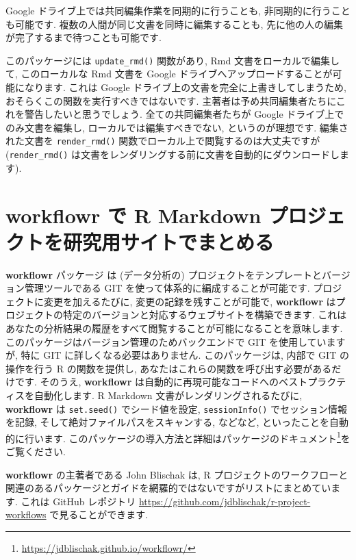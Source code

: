 \documentclass[
  11pt,
]{bxjsreport}
\renewcommand{\href}[2]{#2\footnote{\url{#1}}}
\begin{document}
Google ドライブ上では共同編集作業を同期的に行うことも, 非同期的に行うことも可能です. 複数の人間が同じ文書を同時に編集することも, 先に他の人の編集が完了するまで待つことも可能です.

このパッケージには \texttt{update\_rmd()} 関数があり, Rmd 文書をローカルで編集して, このローカルな Rmd 文書を Google ドライブへアップロードすることが可能になります. これは Google ドライブ上の文書を完全に上書きしてしまうため, おそらくこの関数を実行すべきではないです. 主著者は予め共同編集者たちにこれを警告したいと思うでしょう. 全ての共同編集者たちが Google ドライブ上でのみ文書を編集し, ローカルでは編集すべきでない, というのが理想です. 編集された文書を \texttt{render\_rmd()} 関数でローカル上で閲覧するのは大丈夫ですが (\texttt{render\_rmd()} は文書をレンダリングする前に文書を自動的にダウンロードします).

\hypertarget{workflowr}{%
\section{\texorpdfstring{\textbf{workflowr} で R Markdown プロジェクトを研究用サイトでまとめる}{workflowr で R Markdown プロジェクトを研究用サイトでまとめる}}\label{workflowr}}

\textbf{workflowr} パッケージ \autocite{R-workflowr,workflowr2019}は (データ分析の) プロジェクトをテンプレートとバージョン管理ツールである GIT を使って体系的に編成することが可能です. プロジェクトに変更を加えるたびに, 変更の記録を残すことが可能で, \textbf{workflowr} はプロジェクトの特定のバージョンと対応するウェブサイトを構築できます. これはあなたの分析結果の履歴をすべて閲覧することが可能になることを意味します. このパッケージはバージョン管理のためバックエンドで GIT を使用していますが, 特に GIT に詳しくなる必要はありません. このパッケージは, 内部で GIT の操作を行う R の関数を提供し, あなたはこれらの関数を呼び出す必要があるだけです. そのうえ, \textbf{workflowr} は自動的に再現可能なコードへのベストプラクティスを自動化します. R Markdown 文書がレンダリングされるたびに, \textbf{workflowr} は \texttt{set.seed()} でシード値を設定, \texttt{sessionInfo()} でセッション情報を記録, そして絶対ファイルパスをスキャンする, などなど, といったことを自動的に行います. このパッケージの導入方法と詳細は\href{https://jdblischak.github.io/workflowr/}{パッケージのドキュメント}をご覧ください.

\textbf{workflowr} の主著者である John Blischak は, R プロジェクトのワークフローと関連のあるパッケージとガイドを網羅的ではないですがリストにまとめています. これは GitHub レポジトリ \url{https://github.com/jdblischak/r-project-workflows} で見ることができます.
\end{document}
